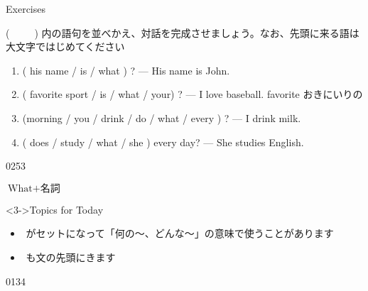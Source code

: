 \documentclass[aspectratio=169,xcolor={dvipsnames,table}]{beamer}
\begin{document}
\begin{frame}[plain]{Exercises}
 

(~~~~~) 内の語句を並べかえ、対話を完成させましょう。なお、先頭に来る語は大文字ではじめてください
\begin{enumerate}
 \item ( his name / is / what ) ? --- His name is John.\\
 \item ( favorite sport / is / what / your) ? --- I love baseball.%
\hfill{\scriptsize favorite  おきにいりの}\\
 \item (morning / you / drink / do / what / every ) ? --- I drink milk.\\
 \item ( does / study / what / she ) every day? --- She studies English.\\
\end{enumerate}

\mbox{}\hfill{\tiny 0253}\,{\scriptsize {}}

\end{frame}
\begin{frame}[plain]{$\text{What} + \text{名詞}$}
\begin{enumerate}
\end{enumerate}

\begin{block}<3->{Topics for Today}
\pause
\begin{itemize}[square]\small
 \item {}\,\,がセットになって「何の〜、どんな～」の意味で使うことがあります
 \item {}\,\,も文の先頭にきます
\end{itemize}
     \end{block}

\mbox{}\hfill{\tiny 0134}\,{\scriptsize {}}



\end{frame}
\end{document}
